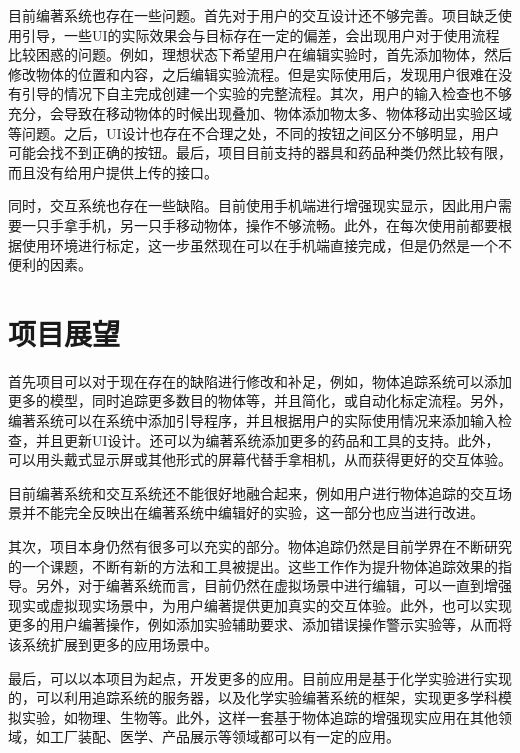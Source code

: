 目前编著系统也存在一些问题。首先对于用户的交互设计还不够完善。项目缺乏使用引导，一些UI的实际效果会与目标存在一定的偏差，会出现用户对于使用流程比较困惑的问题。例如，理想状态下希望用户在编辑实验时，首先添加物体，然后修改物体的位置和内容，之后编辑实验流程。但是实际使用后，发现用户很难在没有引导的情况下自主完成创建一个实验的完整流程。其次，用户的输入检查也不够充分，会导致在移动物体的时候出现叠加、物体添加物太多、物体移动出实验区域等问题。之后，UI设计也存在不合理之处，不同的按钮之间区分不够明显，用户可能会找不到正确的按钮。最后，项目目前支持的器具和药品种类仍然比较有限，而且没有给用户提供上传的接口。

同时，交互系统也存在一些缺陷。目前使用手机端进行增强现实显示，因此用户需要一只手拿手机，另一只手移动物体，操作不够流畅。此外，在每次使用前都要根据使用环境进行标定，这一步虽然现在可以在手机端直接完成，但是仍然是一个不便利的因素。

\section{项目展望}
首先项目可以对于现在存在的缺陷进行修改和补足，例如，物体追踪系统可以添加更多的模型，同时追踪更多数目的物体等，并且简化，或自动化标定流程。另外，编著系统可以在系统中添加引导程序，并且根据用户的实际使用情况来添加输入检查，并且更新UI设计。还可以为编著系统添加更多的药品和工具的支持。此外，可以用头戴式显示屏或其他形式的屏幕代替手拿相机，从而获得更好的交互体验。

目前编著系统和交互系统还不能很好地融合起来，例如用户进行物体追踪的交互场景并不能完全反映出在编著系统中编辑好的实验，这一部分也应当进行改进。

其次，项目本身仍然有很多可以充实的部分。物体追踪仍然是目前学界在不断研究的一个课题，不断有新的方法和工具被提出。这些工作作为提升物体追踪效果的指导。另外，对于编著系统而言，目前仍然在虚拟场景中进行编辑，可以一直到增强现实或虚拟现实场景中，为用户编著提供更加真实的交互体验。此外，也可以实现更多的用户编著操作，例如添加实验辅助要求、添加错误操作警示实验等，从而将该系统扩展到更多的应用场景中。

最后，可以以本项目为起点，开发更多的应用。目前应用是基于化学实验进行实现的，可以利用追踪系统的服务器，以及化学实验编著系统的框架，实现更多学科模拟实验，如物理、生物等。此外，这样一套基于物体追踪的增强现实应用在其他领域，如工厂装配、医学、产品展示等领域都可以有一定的应用。